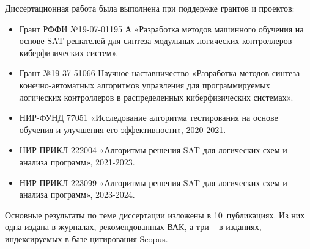 Диссертационная работа была выполнена при поддержке грантов и проектов:
\begin{itemize}[beginpenalty=10000]
    \item Грант РФФИ №19-07-01195 А «Разработка методов машинного
    обучения на основе SAT-решателей для синтеза модульных логических контроллеров киберфизических систем».
    \item Грант №19-37-51066 Научное наставничество «Разработка методов синтеза конечно-автоматных алгоритмов управления для программируемых логических контроллеров в распределенных киберфизических системах».
    \item НИР-ФУНД 77051 «Исследование алгоритма тестирования на основе обучения и улучшения его эффективности», 2020-2021.
    \item НИР-ПРИКЛ 222004 «Алгоритмы решения SAT для логических схем и анализа программ», 2021-2023.
    \item НИР-ПРИКЛ 223099 «Алгоритмы решения SAT для логических схем и анализа программ», 2023-2024.
\end{itemize}


\publications
%
%
Основные результаты по теме диссертации изложены в 10~публикациях.
Из них одна издана в журналах, рекомендованных ВАК,
а три \--- в изданиях, индексируемых в базе цитирования Scopus.





